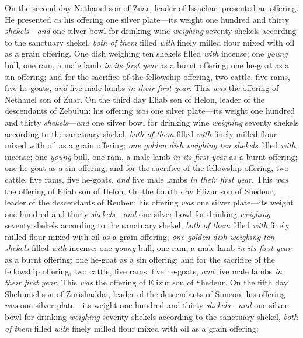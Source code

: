 \begin{biblechapter}
\verse On the second day Nethanel son of Zuar, leader of Issachar, presented an offering.
\verse He presented \textit{as} his offering one silver plate—its weight one hundred and thirty \textit{shekels}—\textit{and} one silver bowl for drinking wine \textit{weighing} seventy shekels according to the sanctuary shekel, \textit{both of them} filled \textit{with} finely milled flour mixed with oil as a grain offering.
\verse One dish weighing ten shekels filled \textit{with} incense;
\verse one \textit{young } bull, one ram, a male lamb \textit{in its first year} as a burnt offering;
\verse one he-goat as a sin offering;
\verse and for the sacrifice of the fellowship offering, two cattle, five rams, five he-goats, \textit{and} five male lambs \textit{in their first year}. This \textit{was} the offering of Nethanel son of Zuar.
\verse On the third day Eliab son of Helon, leader of the descendants of Zebulun:
\verse his offering \textit{was} one silver plate—its weight one hundred and thirty \textit{shekels}—\textit{and} one silver bowl for drinking wine \textit{weighing} seventy shekels according to the sanctuary shekel, \textit{both of them} filled \textit{with} finely milled flour mixed with oil as a grain offering;
\verse \textit{one golden dish weighing ten shekels} filled \textit{with} incense;
\verse one \textit{young} bull, one ram, a male lamb \textit{in its first year} as a burnt offering;
\verse one he-goat as a sin offering;
\verse and for the sacrifice of the fellowship offering, two cattle, five rams, five he-goats, \textit{and} five male lambs \textit{in their first year}. This \textit{was} the offering of Eliab son of Helon.
\verse On the fourth day Elizur son of Shedeur, leader of the descendants of Reuben:
\verse his offering \textit{was} one silver plate—its weight one hundred and thirty \textit{shekels}—\textit{and} one silver bowl for drinking \textit{weighing} seventy shekels according to the sanctuary shekel, \textit{both of them} filled \textit{with} finely milled flour mixed with oil as a grain offering;
\verse \textit{one golden dish weighing ten shekels} filled \textit{with} incense;
\verse one \textit{young} bull, one ram, a male lamb \textit{in its first year} as a burnt offering;
\verse one he-goat as a sin offering;
\verse and for the sacrifice of the fellowship offering, two cattle, five rams, five he-goats, \textit{and} five male lambs \textit{in their first year}. This \textit{was} the offering of Elizur son of Shedeur.
\verse On the fifth day Shelumiel son of Zurishaddai, leader of the descendants of Simeon:
\verse his offering \textit{was} one silver plate—its weight one hundred and thirty \textit{shekels}—\textit{and} one silver bowl for drinking \textit{weighing} seventy shekels according to the sanctuary shekel, \textit{both of them} filled \textit{with} finely milled flour mixed with oil as a grain offering;

\end{biblechapter}
